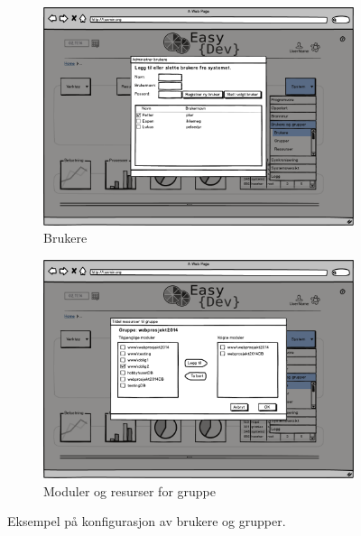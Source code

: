 \begin{figure}[p]
        \vspace{0.6cm}
        \begin{subfigure}[b]{0.48\textwidth}
                \includegraphics[width=\textwidth]
                {./img/prosessdokumentasjon/lowfi/b3.png}
                \caption{Brukere}
                \label{fig:brukere3}
        \end{subfigure}
        \hspace{0.02cm}
        \begin{subfigure}[b]{0.48\textwidth}
                \includegraphics[width=\textwidth]
                {./img/prosessdokumentasjon/lowfi/b4.png}
                \caption{Moduler og resurser for gruppe}
                \label{fig:brukere4}
        \end{subfigure}
        
        \vspace{0.6cm}
        \caption[Konfigurasjon av brukere og grupper]{Eksempel på konfigurasjon av brukere og grupper.}\label{fig:lowfibrukere}
\end{figure}

